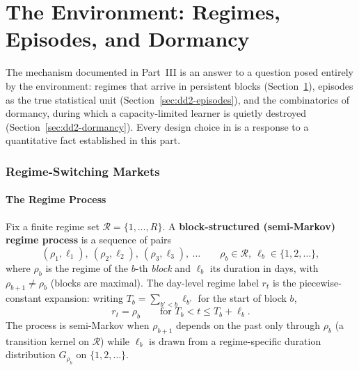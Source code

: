 
\part{The Environment: Regimes, Episodes, and Dormancy}
\label{sec:dd2-part-env}

The mechanism documented in Part~III is an answer to a question posed
entirely by the environment: regimes that arrive in persistent blocks
(Section~\ref{sec:dd2-regimes}), episodes as the true statistical unit
(Section~\ref{sec:dd2-episodes}), and the combinatorics of dormancy, during
which a capacity-limited learner is quietly destroyed
(Section~\ref{sec:dd2-dormancy}). Every design choice in \nm{} is a response
to a quantitative fact established in this part.

\section{Regime-Switching Markets}
\label{sec:dd2-regimes}

\subsection{The Regime Process}

\begin{definition}
\label{def:dd2-regime-process}
Fix a finite regime set $\mathcal{R} = \{1, \ldots, R\}$. A
\textbf{block-structured (semi-Markov) regime process} is a sequence of pairs
\[
(\rho_1, \ell_1),\ (\rho_2, \ell_2),\ (\rho_3, \ell_3),\ \ldots
\qquad \rho_b \in \mathcal{R},\ \ell_b \in \{1, 2, \ldots\},
\]
where $\rho_b$ is the regime of the $b$-th \emph{block} and $\ell_b$ its
duration in days, with $\rho_{b+1} \neq \rho_b$ (blocks are maximal). The
day-level regime label $r_t$ is the piecewise-constant expansion: writing
$T_b = \sum_{b' < b} \ell_{b'}$ for the start of block $b$,
\begin{equation}
\label{eq:dd2-semimarkov}
r_t = \rho_b \qquad \text{for } T_b < t \le T_b + \ell_b .
\end{equation}
The process is semi-Markov when $\rho_{b+1}$ depends on the past only through
$\rho_b$ (a transition kernel on $\mathcal{R}$) while $\ell_b$ is drawn from a
regime-specific duration distribution $G_{\rho_b}$ on $\{1,2,\ldots\}$.
\end{definition}


